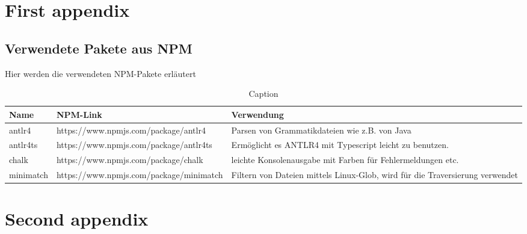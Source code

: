 
\begin{appendices}


\chapter{First appendix}
\section{Verwendete Pakete aus NPM}
Hier werden die verwendeten NPM-Pakete erläutert
\begin{table}[h]
    \centering
    \begin{tabular}{m{2cm}|m{8cm}|m{7.0cm}}
       Name  & NPM-Link & Verwendung  \\
       \hline
        antlr4 & https://www.npmjs.com/package/antlr4 & Parsen von Grammatikdateien wie z.B. von Java\\
        \hline
        antlr4ts & https://www.npmjs.com/package/antlr4ts & Ermöglicht es ANTLR4 mit Typescript leicht zu benutzen. \\\hline
        chalk & https://www.npmjs.com/package/chalk & leichte Konsolenausgabe mit Farben für Fehlermeldungen etc. \\\hline
        minimatch & https://www.npmjs.com/package/minimatch & Filtern von Dateien mittels  Linux-Glob, wird für die Traversierung verwendet\\\hline
    \end{tabular}
    \caption{Caption}
    \label{tab:my_label}
\end{table}





\chapter{Second appendix}
\label{app:second}


\end{appendices}
	
